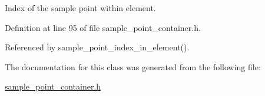Index of the sample point within element. 



Definition at line 95 of file sample\+\_\+point\+\_\+container.\+h.



Referenced by sample\+\_\+point\+\_\+index\+\_\+in\+\_\+element().



The documentation for this class was generated from the following file\+:\begin{DoxyCompactItemize}
\item 
\hyperlink{sample__point__container_8h}{sample\+\_\+point\+\_\+container.\+h}\end{DoxyCompactItemize}
